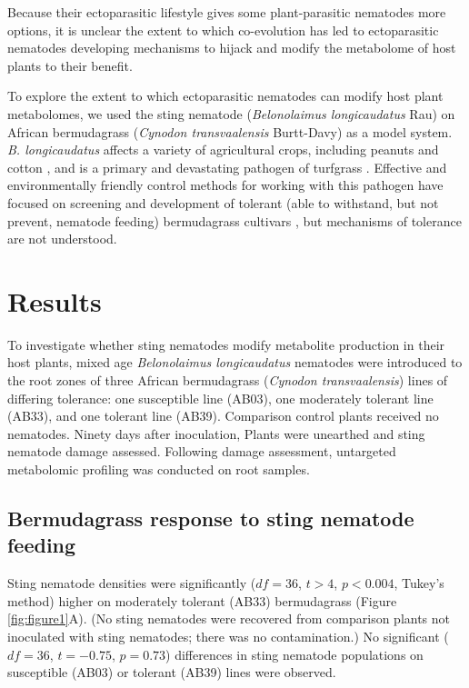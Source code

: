 \documentclass[9pt,lineno]{elife}
\begin{document}
Because their ectoparasitic lifestyle gives some plant-parasitic nematodes more options, it is unclear the extent to which co-evolution has led to ectoparasitic nematodes developing mechanisms to hijack and modify the metabolome of host plants to their benefit.  

To explore the extent to which ectoparasitic nematodes can modify host plant metabolomes, we used the sting nematode (\textit{Belonolaimus longicaudatus} Rau) on African bermudagrass  (\textit{Cynodon transvaalensis} Burtt-Davy) as a model system.  \textit{B. longicaudatus} affects a variety of agricultural crops, including peanuts and cotton \citep{kutsuwa2015belonolaimus,crow2000yield}, and is a primary and devastating pathogen of turfgrass \citep{shaver2017damage, bekal2000population}.   Effective and environmentally friendly control methods for working with this pathogen have focused on screening and development of tolerant (able to withstand, but not prevent, nematode feeding) bermudagrass cultivars \citep{pang2011bermudagrass,pang2011screening}, but mechanisms of tolerance are not understood. 

\section{Results}

To investigate whether sting nematodes modify metabolite production in their host plants, mixed age \textit{Belonolaimus longicaudatus} nematodes were introduced to the root zones of three African bermudagrass (\textit{Cynodon transvaalensis}) lines of differing tolerance: one susceptible line (AB03), one moderately tolerant line (AB33), and one tolerant line (AB39).  Comparison control plants received no nematodes.  Ninety days after inoculation,  Plants were unearthed and sting nematode damage assessed.  Following damage assessment, untargeted metabolomic profiling was conducted on root samples.  

\subsection{Bermudagrass response to sting nematode feeding}
Sting nematode densities were significantly ($df = 36$, $t > 4$, $p < 0.004$, Tukey's method) higher on moderately tolerant (AB33) bermudagrass (Figure \ref{fig:figure1}A).  (No sting nematodes were recovered from comparison plants not inoculated with sting nematodes; there was no contamination.)  No significant ($df = 36$, $t = -0.75$, $p = 0.73$) differences in sting nematode populations on susceptible (AB03) or tolerant (AB39) lines were observed.  
\end{document}
